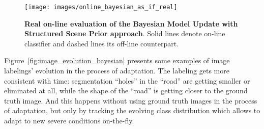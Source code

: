 \begin{figure}[ht]
 \centering
 \texttt{[image: images/online\_bayesian\_as\_if\_real]}
 \caption[Real on-line evaluation of the Bayesian Model Update with Structured Scene Prior approach]{
 {\bf Real on-line evaluation of the Bayesian Model Update with Structured Scene Prior approach}.
 Solid lines denote on-line classifier and dashed lines its off-line counterpart.}
 \label{fig:online_bayesian_as_if_real}
\end{figure}

Figure~\ref{fig:image_evolution_bayesian} presents some examples of image labelings' evolution in the process of adaptation. The labeling gets more 
consistent with time: segmentation ``holes'' in the ``road'' are getting smaller or eliminated at all, while the shape of the ``road'' is getting closer
to the ground truth image. And this happens without using ground truth images in the process of adaptation, but only by tracking the evolving class
distribution which allows to adapt to new severe conditions on-the-fly.

